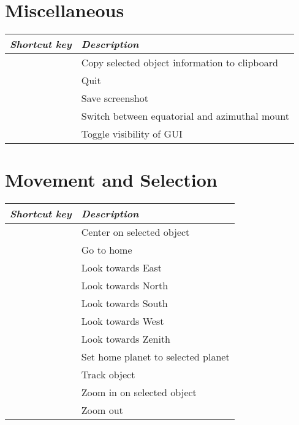 \section{Miscellaneous}
\label{ch:Hotkeys:Miscellaneous}
\begin{longtabu}to \textwidth {rl}
\toprule
\emph{Shortcut key} & \emph{Description}\\\midrule
{}	 	& Copy selected object information to clipboard \\
	 	& Quit \\
	 	& Save screenshot \\
	 	& Switch between equatorial and azimuthal mount \\
	 	& Toggle visibility of GUI \\
\bottomrule
\end{longtabu}

\section{Movement and Selection}
\label{ch:Hotkeys:MovementSelection}
\begin{longtabu}to \textwidth {rl} 
\toprule
\emph{Shortcut key} 	& \emph{Description}\\\midrule
\key{\Space}			& Center on selected object \\
			& Go to home \\
			& Look towards East \\
			& Look towards North \\
			& Look towards South \\
			& Look towards West \\
			& Look towards Zenith \\
			& Set home planet to selected planet \\
					& Track object \\
\key{/}					& Zoom in on selected object \\
\key{\textbackslash{}}	& Zoom out \\
\bottomrule
\end{longtabu}

